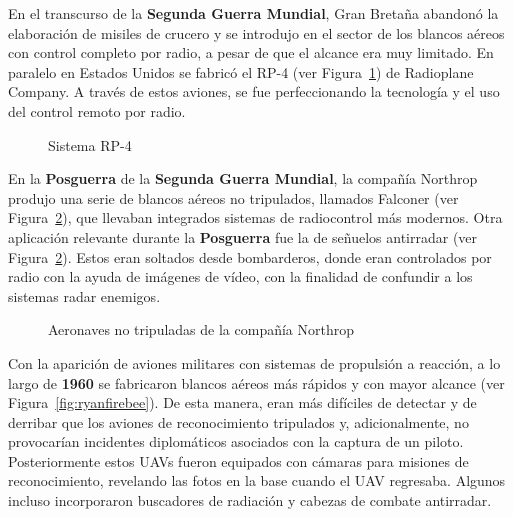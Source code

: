 En el transcurso de la \textbf{Segunda Guerra Mundial}, Gran Bretaña abandonó la elaboración de misiles de crucero y se introdujo en el sector de los blancos aéreos con control completo por radio, a pesar de que el alcance era muy limitado.
En paralelo en Estados Unidos se fabricó el RP-4 (ver Figura~\ref{fig:rp4}) de Radioplane Company. A través de estos aviones, se fue perfeccionando la tecnología y el uso del control remoto por radio.

\begin{figure}[!h]
\begin{center}
\caption[Sistema RP-4]{Sistema RP-4}
\label{fig:rp4}
\end{center}
\end{figure}

En la \textbf{Posguerra} de la \textbf{Segunda Guerra Mundial}, la compañía Northrop produjo una serie de blancos aéreos no tripulados, llamados Falconer (ver Figura~\ref{fig:northrop}), que llevaban integrados sistemas de radiocontrol más modernos. 
Otra aplicación relevante durante la \textbf{Posguerra} fue la de señuelos antirradar (ver Figura~\ref{fig:northrop}). Estos eran soltados desde bombarderos, donde eran controlados por radio con la ayuda de imágenes de vídeo, con la finalidad de confundir a los sistemas radar enemigos.

\clearpage

\begin{figure}[!h]
\begin{center}
\caption[Aeronaves no tripuladas de la compañía Northrop]{Aeronaves no tripuladas de la compañía Northrop}
\label{fig:northrop}
\end{center}
\end{figure}

Con la aparición de aviones militares con sistemas de propulsión a reacción, a lo largo de \textbf{1960}
se fabricaron blancos aéreos más rápidos y con mayor alcance (ver Figura~\ref{fig:ryanfirebee}). De esta manera, eran más difíciles de detectar y de derribar que los aviones de reconocimiento tripulados y, adicionalmente, no provocarían incidentes diplomáticos asociados con la captura de un piloto. 
Posteriormente estos \acs{UAV}s fueron equipados con cámaras para misiones de reconocimiento, revelando las fotos en la base cuando el \acs{UAV} regresaba. Algunos incluso incorporaron buscadores de radiación y cabezas de combate antirradar.

